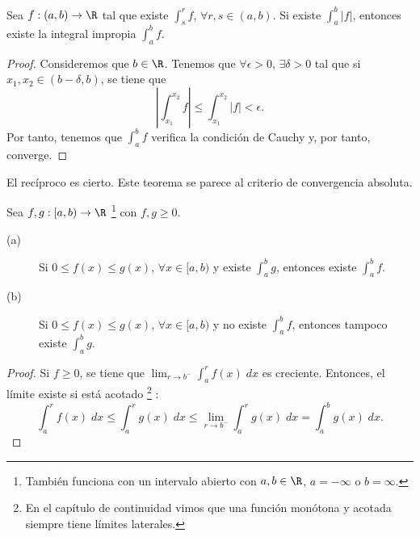 \begin{ftheorem}[]
\normalfont Sea $\displaystyle f: \left(a,b\right) \to \R $ tal que existe $\displaystyle \int^{r}_{s} f $, $\displaystyle \forall r,s \in \left(a,b\right) $. Si existe $\displaystyle \int^{b}_{a} \left|f\right|  $, entonces existe la integral impropia $\displaystyle \int^{b}_{a} f $.
\end{ftheorem}
\begin{proof}
Consideremos que $\displaystyle b \in \R $. Tenemos que $\displaystyle \forall \epsilon > 0 $, $\displaystyle \exists \delta > 0 $ tal que si $\displaystyle x_{1}, x_{2} \in \left(b-\delta, b\right) $, se tiene que 
\[ \left|\int^{x_{2}}_{x_{1}} f \right| \leq \int^{x_{2}}_{x_{1}} \left|f\right| < \epsilon.\]
Por tanto, tenemos que $\displaystyle \int^{b}_{a} f $ verifica la condición de Cauchy y, por tanto, converge. 
\end{proof}
\begin{observation}
\normalfont El recíproco es cierto. Este teorema se parece al criterio de convergencia absoluta.
\end{observation}
\begin{ftheorem}
\normalfont Sea $\displaystyle f,g:[a,b) \to \R $ \footnote{También funciona con un intervalo abierto con $\displaystyle a,b \in \R $, $\displaystyle a = - \infty $ o $\displaystyle b = \infty $.} con $\displaystyle f,g \geq 0 $.
\begin{description}
\item[(a)] Si $\displaystyle 0 \leq f\left(x\right) \leq g\left(x\right) $, $\displaystyle \forall x \in [a,b) $ y existe $\displaystyle \int^{b}_{a} g $, entonces existe $\displaystyle \int^{b}_{a} f $.
\item[(b)] Si $\displaystyle 0 \leq f\left(x\right) \leq g\left(x\right) $, $\displaystyle \forall x \in [a,b) $ y no existe $\displaystyle \int^{b}_{a} f $, entonces tampoco existe $\displaystyle \int^{b}_{a} g $.
\end{description}
\end{ftheorem}
\begin{proof}
	Si $\displaystyle f \geq 0 $, se tiene que $\displaystyle \lim_{r \to b^{-}}\int^{r}_{a} f\left(x\right) \; dx $ es creciente. Entonces, el límite existe si está acotado \footnote{En el capítulo de continuidad vimos que una función monótona y acotada siempre tiene límites laterales.} :
	\[ \int^{r}_{a} f\left(x\right) \; dx \leq \int^{r}_{a} g\left(x\right) \; dx \leq \lim_{r \to b^{-}}\int^{r}_{a} g\left(x\right) \; dx = \int^{b}_{a} g\left(x\right) \; dx .\]
\end{proof}
